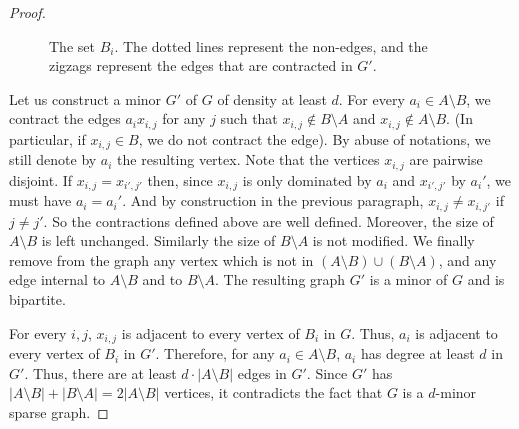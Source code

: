 \documentclass[10pt]{article}
\begin{document}
\begin{proof}
\begin{figure}[bt]
{}
    \caption{The set $B_i$. The dotted lines represent the non-edges, and the zigzags represent the edges that are contracted in $G'$.}
	\label{fig:minor}
\end{figure}

Let us construct a minor $G'$ of $G$ of density at least $d$. For every $a_i\in A\setminus B$, we contract the edges $a_ix_{i,j}$ for any $j$ such that $x_{i,j}\not \in B\setminus A$ and $x_{i,j}\not \in A\setminus B$. (In particular, if $x_{i,j} \in B$, we do not contract the edge). By abuse of notations, we still denote by $a_i$ the resulting vertex. Note that the vertices $x_{i,j}$ are pairwise disjoint. If $x_{i,j}=x_{i',j'}$ then, since $x_{i,j}$ is only dominated by $a_i$ and $x_{i',j'}$ by $a_i'$, we must have $a_i=a_i'$. And by construction in the previous paragraph, $x_{i,j} \ne x_{i,j'}$ if $j \ne j'$. So the contractions defined above are well defined. Moreover, the size of $A\setminus B$ is left unchanged. Similarly the size of $B \setminus A$ is not modified. We finally remove from the graph any vertex which is not in $(A\setminus B)\cup (B\setminus A)$, and any edge internal to $A\setminus B$ and to $B\setminus A$. The resulting graph $G'$ is a minor of $G$ and is bipartite. 

For every $i,j$, $x_{i,j}$ is adjacent to every vertex of $B_i$ in $G$. Thus, $a_i$ is adjacent to every vertex of $B_i$ in $G'$. Therefore, for any $a_i\in A\setminus B$, $a_i$ has degree at least $d$ in $G'$. Thus, there are at least $d \cdot |A\setminus B|$ edges in $G'$. Since $G'$ has $|A\setminus B|+|B\setminus A| = 2|A\setminus B|$ vertices, it contradicts the fact that $G$ is a $d$-minor sparse graph.
\end{proof}
\end{document}
